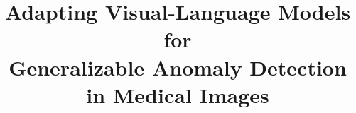 \documentclass[10pt,twocolumn,letterpaper]{article}
\title{Adapting Visual-Language Models for \\Generalizable Anomaly Detection in Medical Images}
\author{}
\begin{document}
\maketitle
    





{
\small


}
\newpage



% 
\end{document}
